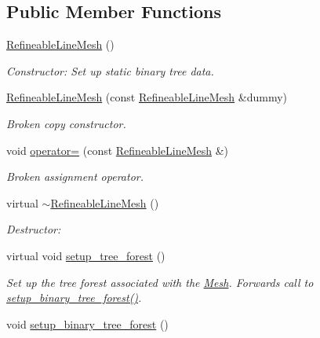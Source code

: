 \subsection*{Public Member Functions}
\begin{DoxyCompactItemize}
\item 
\hyperlink{classoomph_1_1RefineableLineMesh_a971ed8cade766ab0d19aa35c2276f771}{Refineable\+Line\+Mesh} ()
\begin{DoxyCompactList}\small\item\em Constructor\+: Set up static binary tree data. \end{DoxyCompactList}\item 
\hyperlink{classoomph_1_1RefineableLineMesh_aa630559ec1fe3cbf00f9bb94f815d723}{Refineable\+Line\+Mesh} (const \hyperlink{classoomph_1_1RefineableLineMesh}{Refineable\+Line\+Mesh} \&dummy)
\begin{DoxyCompactList}\small\item\em Broken copy constructor. \end{DoxyCompactList}\item 
void \hyperlink{classoomph_1_1RefineableLineMesh_a42040861eecb75e09f5e0401212d57a1}{operator=} (const \hyperlink{classoomph_1_1RefineableLineMesh}{Refineable\+Line\+Mesh} \&)
\begin{DoxyCompactList}\small\item\em Broken assignment operator. \end{DoxyCompactList}\item 
virtual \hyperlink{classoomph_1_1RefineableLineMesh_a7939a82970c7aa6ad2e3e8662e7e9fd1}{$\sim$\+Refineable\+Line\+Mesh} ()
\begin{DoxyCompactList}\small\item\em Destructor\+: \end{DoxyCompactList}\item 
virtual void \hyperlink{classoomph_1_1RefineableLineMesh_a11ee25cace35f302fdf64b623906ea35}{setup\+\_\+tree\+\_\+forest} ()
\begin{DoxyCompactList}\small\item\em Set up the tree forest associated with the \hyperlink{classoomph_1_1Mesh}{Mesh}. Forwards call to \hyperlink{classoomph_1_1RefineableLineMesh_ac87ad1a1be6f9a9e444acea2e42598ff}{setup\+\_\+binary\+\_\+tree\+\_\+forest()}. \end{DoxyCompactList}\item 
void \hyperlink{classoomph_1_1RefineableLineMesh_ac87ad1a1be6f9a9e444acea2e42598ff}{setup\+\_\+binary\+\_\+tree\+\_\+forest} ()
\end{DoxyCompactItemize}
